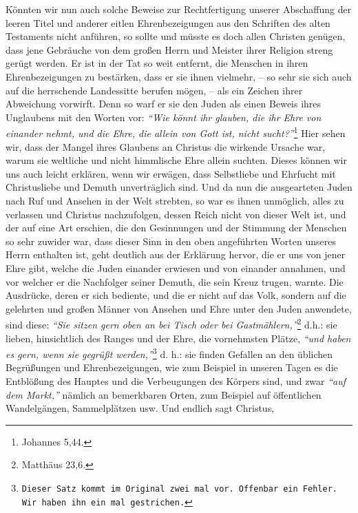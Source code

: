 Könnten wir nun auch solche Beweise zur Rechtfertigung unserer Abschaffung der
leeren Titel und anderer eitlen Ehrenbezeigungen aus den Schriften des alten
Testaments nicht anführen, so sollte und müsste es doch allen Christen genügen,
dass jene Gebräuche von dem großen Herrn und Meister ihrer Religion streng
gerügt
werden. Er ist in der Tat so weit entfernt, die Menschen in ihren
Ehrenbezeigungen zu bestärken, dass er sie ihnen vielmehr, -- so sehr sie sich
auch auf die herrschende Landessitte berufen mögen, -- als ein Zeichen ihrer
Abweichung vorwirft. Denn so warf er sie den Juden als einen Beweis ihres
Unglaubens mit den Worten vor:
\textit{"`Wie könnt ihr glauben, die ihr Ehre von einander
nehmt, und die Ehre, die allein von Gott ist, nicht sucht?"'}\footnote{Johannes
5,44.}
Hier sehen wir, dass der Mangel ihres Glaubens an Christus die wirkende
Ursache war, warum sie weltliche und nicht himmlische Ehre allein suchten.
Dieses können wir uns auch leicht erklären, wenn wir erwägen, dass Selbstliebe
und Ehrfucht mit Christusliebe und Demuth unverträglich sind. Und da nun die
ausgearteten Juden nach Ruf und Ansehen in der Welt strebten, so war es ihnen
unmöglich, alles zu verlassen und Christus nachzufolgen, dessen
Reich nicht von
dieser Welt ist, und der auf eine Art erschien, die den Gesinnungen und der
Stimmung der Menschen so sehr zuwider war, dass dieser Sinn in den oben
angeführten Worten unseres Herrn enthalten ist, geht deutlich aus der Erklärung
hervor, die er uns von jener Ehre gibt, welche die Juden
einander erwiesen und
von einander annahmen, und vor welcher er die Nachfolger seiner Demuth, die sein
Kreuz trugen, warnte. Die Ausdrücke, deren er sich bediente,
und die er nicht
auf das Volk, sondern auf die gelehrten und großen Männer von Ansehen und Ehre
unter den Juden anwendete, sind diese:
\textit{"`Sie sitzen gern oben an bei Tisch
oder bei Gastmählern,"'}\footnote{Matthäus 23,6.}
d.h.: sie lieben, hinsichtlich des
Ranges und der Ehre, die vornehmsten Plätze,
\textit{"`und haben es gern, wenn sie gegrüßt werden,"'}\footnote{\texttt{Dieser
Satz kommt im Original zwei mal vor. Offenbar ein Fehler. Wir haben ihn ein mal
gestrichen.}}
d. h.: sie
finden Gefallen an den üblichen Begrüßungen und Ehrenbezeigungen, wie zum
Beispiel in
unseren Tagen es die Entblößung des Hauptes und die Verbeugungen des Körpers
sind,
und zwar \textit{"`auf dem Markt,"'} nämlich an bemerkbaren Orten, zum Beispiel
auf
öffentlichen Wandelgängen, Sammelplätzen usw. Und endlich sagt Christus,
